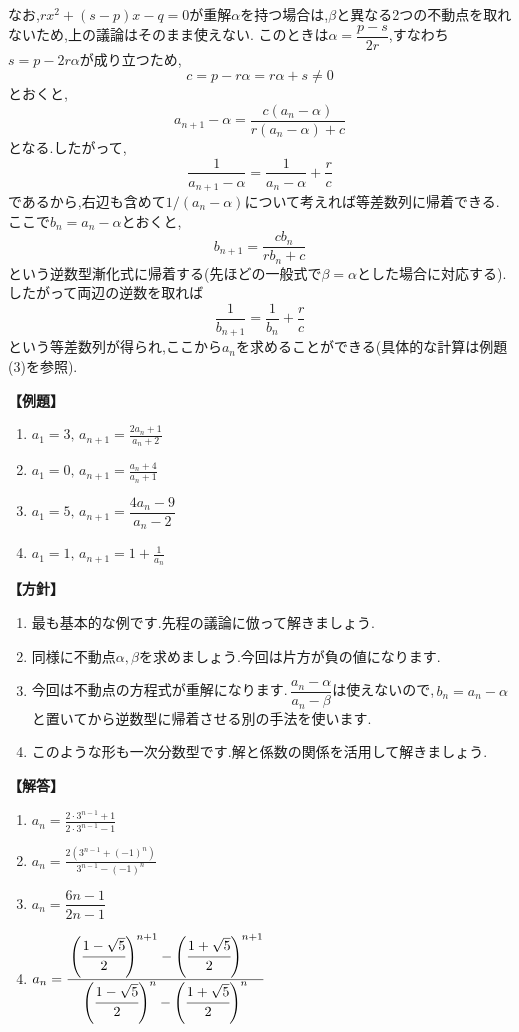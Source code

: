     なお,$rx^2+(s-p)x-q=0$が重解$\alpha$を持つ場合は,$\beta$と異なる2つの不動点を取れないため,上の議論はそのまま使えない.
    このときは$\alpha=\dfrac{p-s}{2r}$,すなわち$s=p-2r\alpha$が成り立つため,
    \[
      c=p-r\alpha=r\alpha+s\ne0
    \]
    とおくと,
    \[
      a_{n+1}-\alpha
      =\frac{c(a_n-\alpha)}{r(a_n-\alpha)+c}
    \]
    となる.したがって,
    \[
      \frac{1}{a_{n+1}-\alpha}
      =\frac{1}{a_n-\alpha}+\frac{r}{c}
    \]
    であるから,右辺も含めて$1/(a_n-\alpha)$について考えれば等差数列に帰着できる.
    ここで$b_n=a_n-\alpha$とおくと,
    \[
      b_{n+1}=\frac{cb_n}{rb_n+c}
    \]
    という逆数型漸化式に帰着する(先ほどの一般式で$\beta=\alpha$とした場合に対応する).したがって両辺の逆数を取れば
    \[
      \frac1{b_{n+1}}=\frac1{b_n}+\frac rc
    \]
    という等差数列が得られ,ここから$a_n$を求めることができる(具体的な計算は例題(3)を参照).

    \noindent \textbf{【例題】}
    \begin{enumerate}[label=(\arabic*),parsep=3pt]
      \item $\displaystyle a_1=3,\, a_{n+1}=\frac{2a_n+1}{a_n+2}$
      \item $\displaystyle a_1=0,\, a_{n+1}=\frac{a_n+4}{a_n+1}$
      \item $\displaystyle a_1=5,\, a_{n+1}=\dfrac{4a_{n}-9}{a_{n}-2}$
      \item $\displaystyle a_1=1,\, a_{n+1}=1+\frac{1}{a_n}$
    \end{enumerate}

    \noindent\textbf{【方針】}
    \begin{enumerate}[label=(\arabic*),parsep=3pt]
      \item 最も基本的な例です.先程の議論に倣って解きましょう.
      \item 同様に不動点$\alpha,\beta$を求めましょう.今回は片方が負の値になります.
      \item 今回は不動点の方程式が重解になります.\,$\dfrac{a_n-\alpha}{a_n-\beta}$は使えないので,\,$b_n=a_n-\alpha$と置いてから逆数型に帰着させる別の手法を使います.
      \item このような形も一次分数型です.解と係数の関係を活用して解きましょう.
    \end{enumerate}

    \noindent\textbf{【解答】}
    \begin{enumerate}[label=(\arabic*),parsep=3pt]
      \item $\displaystyle a_n=\frac{2\cdot3^{n-1}+1}{2\cdot3^{n-1}-1}$
      \item $\displaystyle a_n=\frac{2\left(3^{n-1}+(-1)^n\right)}{3^{n-1}-(-1)^n}$
      \item $a_{n}=\dfrac{6n-1}{2n-1}$
      \item $\displaystyle a_n=\cfrac{\left(\cfrac{1-\sqrt{5}}{2}\right)^{n+1}-\left(\cfrac{1+\sqrt{5}}{2}\right)^{n+1}}{\left(\cfrac{1-\sqrt{5}}{2}\right)^n-\left(\cfrac{1+\sqrt{5}}{2}\right)^n}$
    \end{enumerate}

